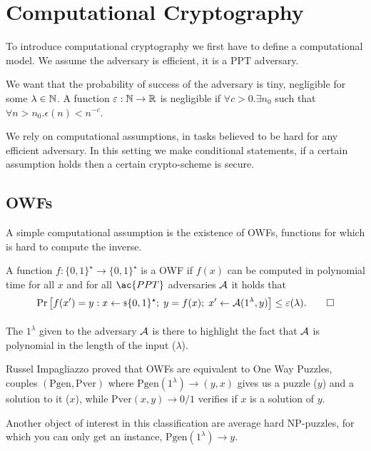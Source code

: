 
\chapter{Computational Cryptography}


To introduce computational cryptography we first have to define a computational model.
We assume the adversary is efficient, \ie it is a \ac{PPT} adversary.

We want that the probability of success of the adversary is tiny, \ie negligible for some $\lambda \in \mathbb{N}$.
A function $\varepsilon : \mathbb{N} \to \mathbb{R}$ is negligible if $\forall c > 0 . \exists n_0$ such that $\forall n > n_0 . \epsilon(n) < n^{-c}$.

We rely on computational assumptions, \ie in tasks believed to be hard for any efficient adversary.
In this setting we make conditional statements, \ie if a certain assumption holds then a certain crypto-scheme is secure.

\section{\aclp{OWF}}

A simple computational assumption is the existence of \acp{OWF}, \ie functions for which is hard to compute the inverse.

\begin{definition}
	A function $f : \{0,1\}^{\star} \to \{0,1\}^{\star}$ is a \ac{OWF} if $f(x)$ can be computed in polynomial time for all $x$ and for all $\ac{PPT}$ adversaries $\mathcal{A}$ it holds that
	\begin{equation*}
		\mathop{\mathrm{Pr}}\limits_{} \left[ {f(x') = y : x \leftarrow {\scriptstyle \$} {\{0,1\}^{\star}}; \; y = f(x); \; x' \leftarrow \mathcal{A}(1^{\lambda}, y)} \right] \le \varepsilon(\lambda). \qedhere
	\end{equation*}
\end{definition}

The $1^{\lambda}$ given to the adversary $\mathcal{A}$ is there to highlight the fact that $\mathcal{A}$ is polynomial in the length of the input ($\lambda$).

Russel Impagliazzo proved that \acp{OWF} are equivalent to One Way Puzzles, \ie couples $(\mathrm{Pgen}, \mathrm{Pver})$ where $\mathrm{Pgen}(1^{\lambda}) \to (y, x)$ gives us a puzzle ($y$) and a solution to it ($x$), while $\mathrm{Pver}(x,y) \to 0/1$ verifies if $x$ is a solution of $y$.

Another object of interest in this classification are average hard NP-puzzles, for which you can only get an instance, \ie $\mathrm{Pgen}(1^{\lambda}) \to y$.

